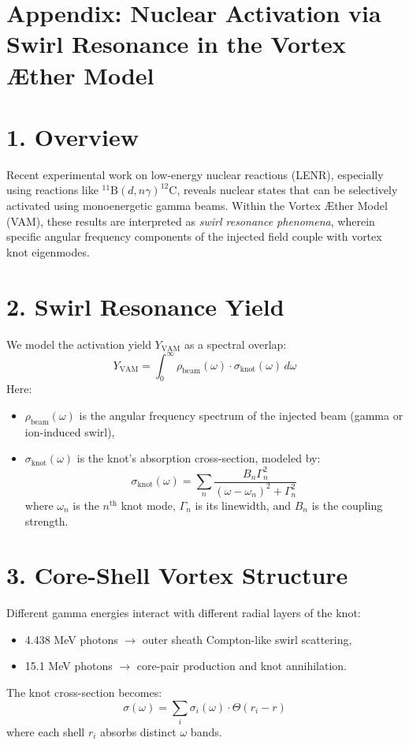 \section{Appendix: Nuclear Activation via Swirl Resonance in the Vortex Æther Model}

\section*{1. Overview}
Recent experimental work on low-energy nuclear reactions (LENR), especially using reactions like $^{11}\mathrm{B}(d,n\gamma)^{12}\mathrm{C}$, reveals nuclear states that can be selectively activated using monoenergetic gamma beams. Within the Vortex Æther Model (VAM), these results are interpreted as \textit{swirl resonance phenomena}, wherein specific angular frequency components of the injected field couple with vortex knot eigenmodes.
\section*{2. Swirl Resonance Yield}
We model the activation yield $Y_{\mathrm{VAM}}$ as a spectral overlap:
\[
Y_{\mathrm{VAM}} = \int_0^\infty \rho_{\mathrm{beam}}(\omega) \cdot \sigma_{\mathrm{knot}}(\omega) \, d\omega
\]
Here:
\begin{itemize}
  \item $\rho_{\mathrm{beam}}(\omega)$ is the angular frequency spectrum of the injected beam (gamma or ion-induced swirl),
  \item $\sigma_{\mathrm{knot}}(\omega)$ is the knot's absorption cross-section, modeled by:
  \[
  \sigma_{\mathrm{knot}}(\omega) = \sum_n \frac{B_n \Gamma_n^2}{(\omega - \omega_n)^2 + \Gamma_n^2}
  \]
  where $\omega_n$ is the $n^\text{th}$ knot mode, $\Gamma_n$ is its linewidth, and $B_n$ is the coupling strength.
\end{itemize}
\section*{3. Core-Shell Vortex Structure}
Different gamma energies interact with different radial layers of the knot:
\begin{itemize}
  \item 4.438 MeV photons $\rightarrow$ outer sheath Compton-like swirl scattering,
  \item 15.1 MeV photons $\rightarrow$ core-pair production and knot annihilation.
\end{itemize}
The knot cross-section becomes:
\[
\sigma(\omega) = \sum_i \sigma_i(\omega) \cdot \Theta(r_i - r)
\]
where each shell $r_i$ absorbs distinct $\omega$ bands.
